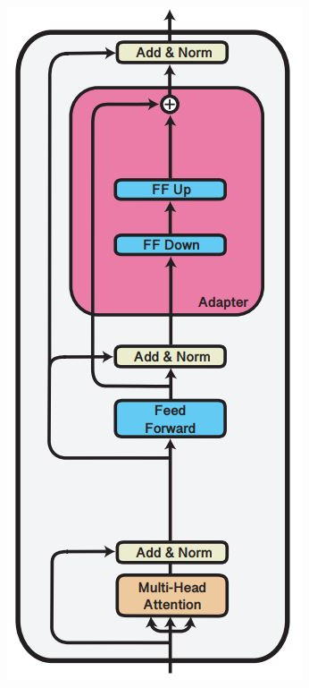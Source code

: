 \begin{figure}[H]
     \centering
     \begin{subfigure}[b]{0.3\textwidth}
         \centering
         \includegraphics[width=\textwidth]{figures/adapters_pfeiffer.JPG}

\end{subfigure}
\end{figure}
